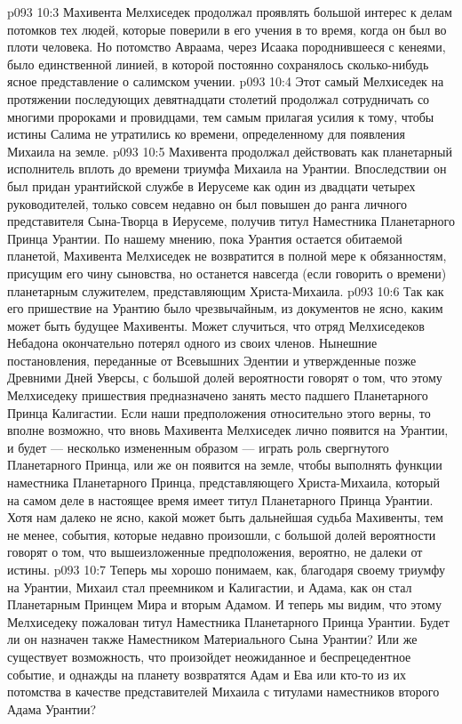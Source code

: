 \vs p093 10:3 \pc Махивента Мелхиседек продолжал проявлять большой интерес к делам потомков тех людей, которые поверили в его учения в то время, когда он был во плоти человека. Но потомство Авраама, через Исаака породнившееся с кенеями, было единственной линией, в которой постоянно сохранялось сколько\hyp{}нибудь ясное представление о салимском учении.
\vs p093 10:4 Этот самый Мелхиседек на протяжении последующих девятнадцати столетий продолжал сотрудничать со многими пророками и провидцами, тем самым прилагая усилия к тому, чтобы истины Салима не утратились ко времени, определенному для появления Михаила на земле.
\vs p093 10:5 Махивента продолжал действовать как планетарный исполнитель вплоть до времени триумфа Михаила на Урантии. Впоследствии он был придан урантийской службе в Иерусеме как один из двадцати четырех руководителей, только совсем недавно он был повышен до ранга личного представителя Сына\hyp{}Творца в Иерусеме, получив титул Наместника Планетарного Принца Урантии. По нашему мнению, пока Урантия остается обитаемой планетой, Махивента Мелхиседек не возвратится в полной мере к обязанностям, присущим его чину сыновства, но останется навсегда (если говорить о времени) планетарным служителем, представляющим Христа\hyp{}Михаила.
\vs p093 10:6 Так как его пришествие на Урантию было чрезвычайным, из документов не ясно, каким может быть будущее Махивенты. Может случиться, что отряд Мелхиседеков Небадона окончательно потерял одного из своих членов. Нынешние постановления, переданные от Всевышних Эдентии и утвержденные позже Древними Дней Уверсы, с большой долей вероятности говорят о том, что этому Мелхиседеку пришествия предназначено занять место падшего Планетарного Принца Калигастии. Если наши предположения относительно этого верны, то вполне возможно, что вновь Махивента Мелхиседек лично появится на Урантии, и будет --- несколько измененным образом --- играть роль свергнутого Планетарного Принца, или же он появится на земле, чтобы выполнять функции наместника Планетарного Принца, представляющего Христа\hyp{}Михаила, который на самом деле в настоящее время имеет титул Планетарного Принца Урантии. Хотя нам далеко не ясно, какой может быть дальнейшая судьба Махивенты, тем не менее, события, которые недавно произошли, с большой долей вероятности говорят о том, что вышеизложенные предположения, вероятно, не далеки от истины.
\vs p093 10:7 Теперь мы хорошо понимаем, как, благодаря своему триумфу на Урантии, Михаил стал преемником и Калигастии, и Адама, как он стал Планетарным Принцем Мира и вторым Адамом. И теперь мы видим, что этому Мелхиседеку пожалован титул Наместника Планетарного Принца Урантии. Будет ли он назначен также Наместником Материального Сына Урантии? Или же существует возможность, что произойдет неожиданное и беспрецедентное событие, и однажды на планету возвратятся Адам и Ева или кто\hyp{}то из их потомства в качестве представителей Михаила с титулами наместников второго Адама Урантии?
